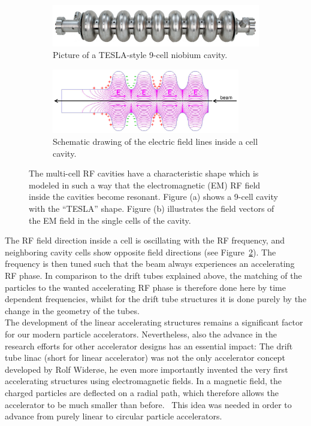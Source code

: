 \begin{figure}
\begin{subfigure}[b]{0.49\textwidth}
\centering
 \includegraphics[width=\textwidth]{Figures/Tesla_Cavity.jpg}
\caption[Tesla-style 9-cell cavity]{Picture of a TESLA-style 9-cell niobium cavity.~\cite[p. 15]{TDR31}}
\label{fig:Tesla_Cavity}
\end{subfigure}\hfill
\begin{subfigure}[b]{0.49\textwidth}
\centering
 \includegraphics[width=0.9\textwidth]{Figures/Cavity.png}
\caption[Electric field in a cell cavity]{Schematic drawing of the electric field lines inside a cell cavity.~\cite[p. 47]{Desy_SummerStudent_Lecture}}
\label{fig:Cavity}
\end{subfigure}
\caption[RF cavities]{The multi-cell RF cavities have a characteristic shape which is modeled in such a way that the electromagnetic (EM) RF field inside the cavities become resonant. Figure (a) shows a 9-cell cavity with the ``TESLA'' shape. Figure (b) illustrates the field vectors of the EM field in the single cells of the cavity.}
\label{fig:Cavities}
\end{figure}
The RF field direction inside a cell is oscillating with the RF frequency, and neighboring cavity cells show opposite field directions (see Figure~\ref{fig:Cavity}).
The frequency is then tuned such that the beam always experiences an accelerating RF phase.
In comparison to the drift tubes explained above, the matching of the particles to the wanted accelerating RF phase is therefore done here by time dependent frequencies, whilst for the drift tube structures it is done purely by the change in the geometry of the tubes.
\\
The development of the linear accelerating structures remains a significant factor for our modern particle accelerators.
Nevertheless, also the advance in the research efforts for other accelerator designs has an essential impact:
The drift tube linac (short for linear accelerator) was not the only accelerator concept developed by Rolf Wider\o e, he even more importantly invented the very first accelerating structures using electromagnetic fields.
In a magnetic field, the charged particles are deflected on a radial path, which therefore allows the accelerator to be much smaller than before.~\cite[cf. p. 8]{Wilson}
This idea was needed in order to advance from purely linear to circular particle accelerators.


